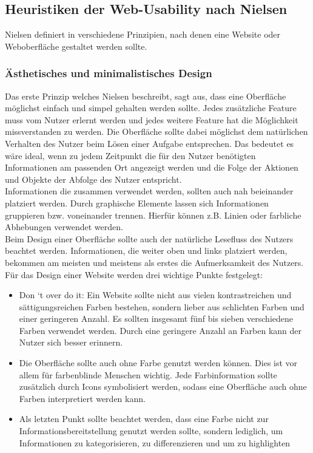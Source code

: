 \documentclass[utf8,biblatex]{lni}
\begin{document}
\subsection{Heuristiken der Web-Usability nach Nielsen}\label{chp:heuristics}
Nielsen definiert in \cite{Nielsen.UE} verschiedene Prinzipien, nach denen eine Website oder Weboberfläche gestaltet werden sollte.


\subsubsection{Ästhetisches und minimalistisches Design}
Das erste Prinzip welches Nielsen beschreibt, sagt aus, dass eine Oberfläche möglichst einfach und simpel gehalten werden sollte. Jedes zusätzliche Feature muss vom Nutzer erlernt werden und jedes weitere Feature hat die Möglichkeit missverstanden zu werden. Die Oberfläche sollte dabei möglichst dem natürlichen Verhalten des Nutzer beim Lösen einer Aufgabe entsprechen. Das bedeutet es wäre ideal, wenn zu jedem Zeitpunkt die für den Nutzer benötigten Informationen am passenden Ort angezeigt werden und die Folge der Aktionen und Objekte der Abfolge des Nutzer entspricht. \\
Informationen die zusammen verwendet werden, sollten auch nah beieinander platziert werden. Durch graphische Elemente lassen sich Informationen gruppieren bzw. voneinander trennen. Hierfür können z.B. Linien oder farbliche Abhebungen verwendet werden.\\
Beim Design einer Oberfläche sollte auch der natürliche Lesefluss des Nutzers beachtet werden. Informationen, die weiter oben und links platziert werden, bekommen am meisten und meistens als erstes die Aufmerksamkeit des Nutzers.\\
Für das Design einer Website werden drei wichtige Punkte festgelegt:
\begin{itemize}
  \item Don ‘t over do it: Ein Website sollte nicht aus vielen kontrastreichen und sättigungsreichen Farben bestehen, sondern lieber aus schlichten Farben und einer geringeren Anzahl. Es sollten insgesamt fünf bis sieben verschiedene Farben verwendet werden. Durch eine geringere Anzahl an Farben kann der Nutzer sich besser erinnern.
  \item Die Oberfläche sollte auch ohne Farbe genutzt werden können. Dies ist vor allem für farbenblinde Menschen wichtig. Jede Farbinformation sollte zusätzlich durch Icons symbolisiert werden, sodass eine Oberfläche auch ohne Farben interpretiert werden kann.
  \item Als letzten Punkt sollte beachtet werden, dass eine Farbe nicht zur Informationsbereitstellung genutzt werden sollte, sondern lediglich, um Informationen zu kategorisieren, zu differenzieren und um zu highlighten
\end{itemize}
\end{document}

